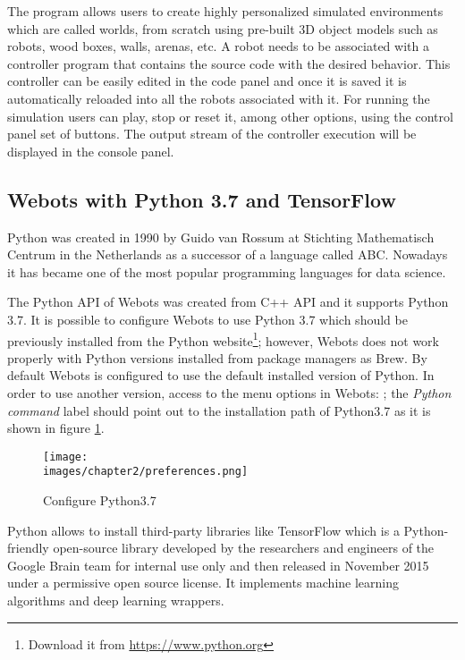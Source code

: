 The program allows users to create highly personalized simulated environments which are called worlds, from scratch using pre-built 3D object models such as robots, wood boxes, walls, arenas, etc. A robot needs to be associated with a controller program that contains the source code with the desired behavior. This controller can be easily edited in the code panel and once it is saved it is automatically reloaded into all the robots associated with it. For running the simulation users can play, stop or reset it, among other options, using the control panel set of buttons. The output stream of the controller execution will be displayed in the console panel. 


\subsection{Webots with Python 3.7 and TensorFlow}

Python was created in 1990 by Guido van Rossum at Stichting Mathematisch Centrum in the Netherlands as a successor of a language called ABC\cite{python-docs}. Nowadays it has became one of the most popular programming languages for data science\cite{Raschka:2015:PML:2886323}.

The Python API of Webots was created from C++ API and it supports Python 3.7. It is possible to configure Webots to use Python 3.7 which should be previously installed from the Python website\footnote{Download it from \url{https://www.python.org}}; however, Webots does not work properly with Python versions installed from package managers as Brew. By default Webots is configured to use the default installed version of Python. In order to use another version, access to the menu options in Webots: ; the \textit{Python command} label should point out to the installation path of Python3.7 as it is shown in figure \ref{fig-ch-2:python}. 

\begin{figure}[ht]
	\texttt{[image: \\images/chapter2/preferences.png]}
	\caption{Configure Python3.7}
	\label{fig-ch-2:python}
\end{figure}

Python allows to install third-party libraries like TensorFlow which is a Python-friendly open-source library developed by the researchers and engineers of the Google Brain team for internal use only and  then released in November 2015 under a permissive open source license. It implements machine learning algorithms and deep learning wrappers\cite{Raschka:2015:PML:2886323}.

